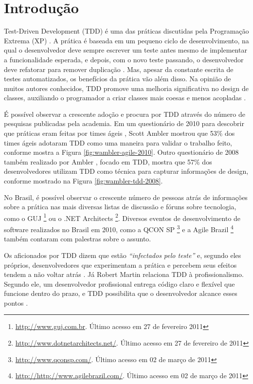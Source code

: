 \chapter{Introdução}
\label{cap:introducao}

Test-Driven Development (TDD) é uma das práticas discutidas pela Programação
Extrema (XP) \cite{XPExplained}. A prática é baseada em um pequeno ciclo de
desenvolvimento, na qual o desenvolvedor deve sempre escrever um teste antes
mesmo de implementar a funcionalidade esperada, e depois, com o novo teste
passando, o desenvolvedor deve refatorar para remover duplicação
\cite{TDDByExample}.
Mas, apesar da constante escrita de testes automatizados, os benefícios da
prática vão além disso. Na opinião de muitos autores conhecidos, TDD promove
uma melhoria significativa no design de classes, auxiliando o programador a
criar classes mais coesas e menos acopladas \cite{TDDByExample} \cite{GOOS} 
\cite{astels-tdd}.

É possível observar a crescente adoção e procura por TDD
através do número de pesquisas publicadas pela academia.
Em um questionário de 2010 para descobrir que práticas eram feitas por times
ágeis \cite{wambler-survey-agile}, Scott Ambler mostrou que 53\% dos times ágeis
adotaram TDD como uma maneira para validar o trabalho feito, conforme mostra a 
Figura \ref{fig:wambler-agile-2010}. Outro questionário de 2008 também realizado por Ambler
\cite{wambler-survey-tdd}, focado em TDD, mostra que 57\% dos desenvolvedores 
utilizam TDD como técnica para capturar informações de design, conforme mostrado
na Figura \ref{fig:wambler-tdd-2008}.

No Brasil, é possível observar o crescente número de pessoas atrás de
informações sobre a prática nas mais diversas listas de discussão e fóruns sobre
tecnologia, como o GUJ \footnote{\url{http://www.guj.com.br}.
Último acesso em 27 de fevereiro 2011} ou o .NET Architects 
\footnote{\url{http://www.dotnetarchitects.net/}. Último acesso em
27 de fevereiro de 2011}. Diversos eventos de desenvolvimento de
software realizados no Brasil em 2010, como a QCON SP
\footnote{\url{http://www.qconsp.com/}. Último acesso em 02 de março de 2011} e
a Agile Brazil \footnote{\url{http://http://www.agilebrazil.com/}. Último acesso
em 02 de março de 2011} também contaram com palestras sobre o assunto.

Os aficionados por TDD dizem que estão \textit{``infectados pelo teste''}  e,
segundo eles próprios, desenvolvedores que experimentam a prática e percebem
seus efeitos tendem a não voltar atrás \cite{tdd-fearless}.
Já Robert Martin relaciona TDD à profissionalismo. Segundo ele, um desenvolvedor
profissional entrega código claro e flexível que funcione dentro do prazo, e TDD
possibilita que o desenvolvedor alcance esses pontos \cite{martin-profissionalismo}.

